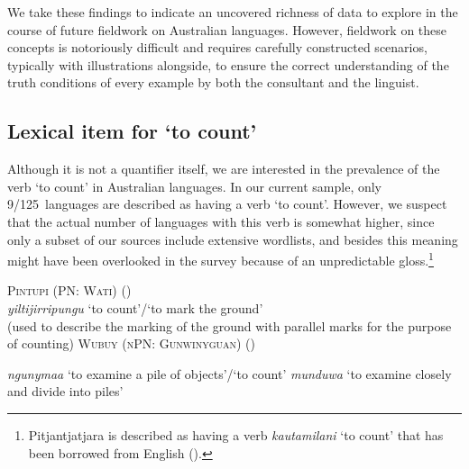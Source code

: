 \documentclass[12pt,egregdoesnotlikesansseriftitles]{scrartcl}
\newcommand{\ofy}{/125} %
\begin{document}
We take these findings to indicate an uncovered richness of data to explore in the course of future fieldwork on Australian languages. However, fieldwork on these concepts is notoriously difficult and requires carefully constructed scenarios, typically with illustrations alongside, to ensure the correct understanding of the truth conditions of every example by both the consultant and the linguist.





\subsection{Lexical item for `to count'}

Although it is not a quantifier itself, we are interested in the prevalence of the verb `to count' in Australian languages. In our current sample, only 9\ofy\ languages are described as having a verb `to count'. However, we suspect that the actual number of languages with this verb is %
somewhat higher, since only a subset of our sources include extensive wordlists, and besides this meaning might have been overlooked in the survey because of an unpredictable gloss.\footnote{Pitjantjatjara is described as having a verb \textit{kautamilani} `to count' that has been borrowed from English (\citealt[36]{goddard92}).}


\begin{exe}
  \ex \textsc{Pintupi (PN: Wati)} \hfill (\citealt[179]{pintupi77})\\
  \textit{yiltijirripungu} `to count'/`to mark the ground'\\
  (used to describe the marking of the ground with parallel marks for the purpose of counting)
  \ex \textsc{Wubuy (nPN: Gunwinyguan)} \hfill (\citealt{nuydict})
  \begin{xlist}
     \ex \textit{ngunymaa} `to examine a pile of objects'/`to count'
    \ex \textit{munduwa} `to examine closely and divide into piles'
  \end{xlist}
\end{exe} 
\end{document}
